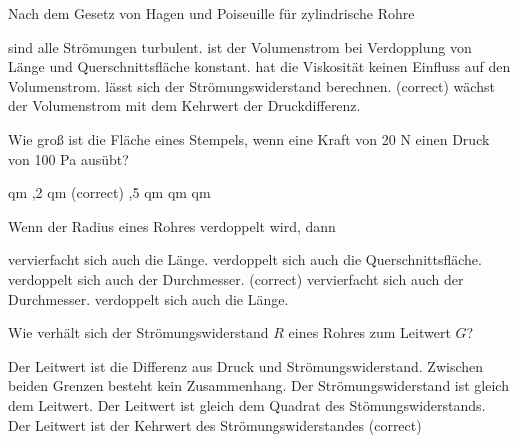 \documentclass[11pt]{exam}
\begin{document}
\setlength{\voffset}{-0.5in}
\setlength{\headsep}{5pt}

\hspace{2mm}
 \hspace{5mm}
\vspace{4mm}

\begin{questions}

\question Nach dem Gesetz von Hagen und Poiseuille für zylindrische Rohre

\begin{choices}
	\choice sind alle Strömungen turbulent.
	\choice ist der Volumenstrom bei Verdopplung von Länge und Querschnittsfläche konstant.
	\choice hat die Viskosität keinen Einfluss auf den Volumenstrom.
	\choice lässt sich der Strömungswiderstand berechnen. (correct)
	\choice wächst der Volumenstrom mit dem Kehrwert der Druckdifferenz.
\end{choices}

\vspace{3mm}\question Wie groß ist die Fläche eines Stempels, wenn eine Kraft von 20 N einen Druck von 100 Pa ausübt?

\begin{choices}
	 qm
	,2 qm (correct)
	,5 qm
	 qm
	 qm
\end{choices}

\vspace{3mm}\question Wenn der Radius eines Rohres verdoppelt wird, dann

\begin{choices}
	\choice vervierfacht sich auch die Länge.
	\choice verdoppelt sich auch die Querschnittsfläche.
	\choice verdoppelt sich auch der Durchmesser. (correct)
	\choice vervierfacht sich auch der Durchmesser.
	\choice verdoppelt sich auch die Länge.
\end{choices}

\vspace{3mm}\question Wie verhält sich der Strömungswiderstand \(R\) eines Rohres zum Leitwert \(G\)?

\begin{choices}
	\choice Der Leitwert ist die Differenz aus Druck und Strömungswiderstand.
	\choice Zwischen beiden Grenzen besteht kein Zusammenhang.
	\choice Der Strömungswiderstand ist gleich dem Leitwert.
	\choice Der Leitwert ist gleich dem Quadrat des Stömungswiderstands.
	\choice Der Leitwert ist der Kehrwert des Strömungswiderstandes (correct)
\end{choices}


\end{questions}
\end{document}

